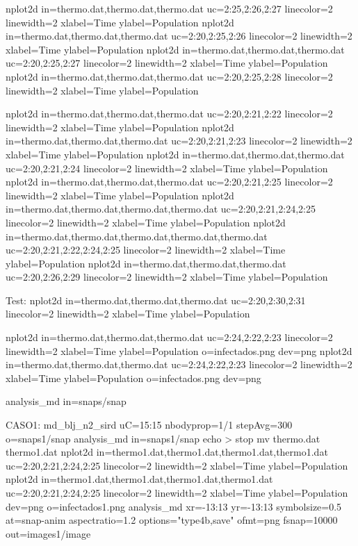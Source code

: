 nplot2d in=thermo.dat,thermo.dat,thermo.dat uc=2:25,2:26,2:27 linecolor=2 linewidth=2 xlabel=Time ylabel=Population
nplot2d in=thermo.dat,thermo.dat,thermo.dat uc=2:20,2:25,2:26 linecolor=2 linewidth=2 xlabel=Time ylabel=Population
nplot2d in=thermo.dat,thermo.dat,thermo.dat uc=2:20,2:25,2:27 linecolor=2 linewidth=2 xlabel=Time ylabel=Population
nplot2d in=thermo.dat,thermo.dat,thermo.dat uc=2:20,2:25,2:28 linecolor=2 linewidth=2 xlabel=Time ylabel=Population

nplot2d in=thermo.dat,thermo.dat,thermo.dat uc=2:20,2:21,2:22 linecolor=2 linewidth=2 xlabel=Time ylabel=Population
nplot2d in=thermo.dat,thermo.dat,thermo.dat uc=2:20,2:21,2:23 linecolor=2 linewidth=2 xlabel=Time ylabel=Population
nplot2d in=thermo.dat,thermo.dat,thermo.dat uc=2:20,2:21,2:24 linecolor=2 linewidth=2 xlabel=Time ylabel=Population
nplot2d in=thermo.dat,thermo.dat,thermo.dat uc=2:20,2:21,2:25 linecolor=2 linewidth=2 xlabel=Time ylabel=Population
nplot2d in=thermo.dat,thermo.dat,thermo.dat,thermo.dat uc=2:20,2:21,2:24,2:25 linecolor=2 linewidth=2 xlabel=Time ylabel=Population
nplot2d in=thermo.dat,thermo.dat,thermo.dat,thermo.dat,thermo.dat uc=2:20,2:21,2:22,2:24,2:25 linecolor=2 linewidth=2 xlabel=Time ylabel=Population
nplot2d in=thermo.dat,thermo.dat,thermo.dat uc=2:20,2:26,2:29 linecolor=2 linewidth=2 xlabel=Time ylabel=Population

Test:
nplot2d in=thermo.dat,thermo.dat,thermo.dat uc=2:20,2:30,2:31 linecolor=2 linewidth=2 xlabel=Time ylabel=Population


nplot2d in=thermo.dat,thermo.dat,thermo.dat uc=2:24,2:22,2:23 linecolor=2 linewidth=2 xlabel=Time ylabel=Population o=infectados.png dev=png
nplot2d in=thermo.dat,thermo.dat,thermo.dat uc=2:24,2:22,2:23 linecolor=2 linewidth=2 xlabel=Time ylabel=Population o=infectados.png dev=png

analysis_md in=snaps/snap%

CASO1:
md_blj_n2_sird uC=15:15 nbodyprop=1/1 stepAvg=300 o=snaps1/snap%
analysis_md in=snaps1/snap%
echo > stop
mv thermo.dat thermo1.dat
nplot2d in=thermo1.dat,thermo1.dat,thermo1.dat,thermo1.dat uc=2:20,2:21,2:24,2:25 linecolor=2 linewidth=2 xlabel=Time ylabel=Population
nplot2d in=thermo1.dat,thermo1.dat,thermo1.dat,thermo1.dat uc=2:20,2:21,2:24,2:25 linecolor=2 linewidth=2 xlabel=Time ylabel=Population dev=png o=infectados1.png
analysis_md xr=-13:13 yr=-13:13 symbolsize=0.5 at=snap-anim aspectratio=1.2 options="type4b,save" ofmt=png fsnap=10000 out=images1/image%

